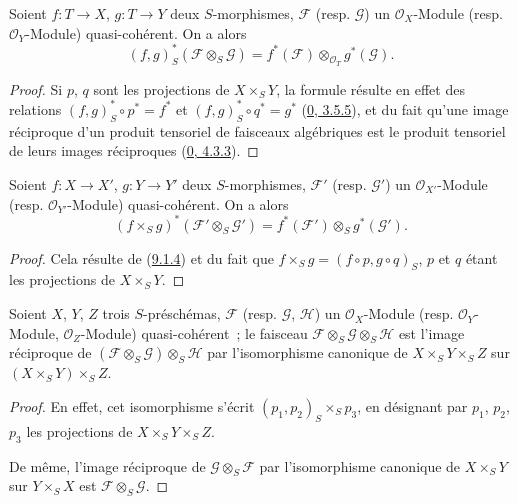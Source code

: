 \begin{proposition}[9.1.4]
\label{I.9.1.4-fr}
Soient $f:T\to X$, $g:T\to Y$ deux $S$-morphismes, $\mathscr{F}$ (resp.
$\mathscr{G}$) un $\mathscr{O}_X$-Module (resp. $\mathscr{O}_Y$-Module)
quasi-cohérent. On a alors
\[
  (f,g)_S^*(\mathscr{F}\otimes_S\mathscr{G})
  =f^*(\mathscr{F})\otimes_{\mathscr{O}_T}g^*(\mathscr{G}).
\]
\end{proposition}

\begin{proof}
Si $p$, $q$ sont les projections de $X\times_S Y$, la formule résulte en
effet des relations $(f,g)_S^*\circ p^*=f^*$ et
$(f,g)_S^*\circ q^*=g^*$ (\hyperref[0.3.5.5-fr]{0, 3.5.5}), et du fait
qu'une image réciproque d'un produit tensoriel de faisceaux algébriques est
le produit tensoriel de leurs images réciproques
(\hyperref[0.4.3.3-fr]{0, 4.3.3}).
\end{proof}

\begin{corollary}[9.1.5]
\label{I.9.1.5-fr}
Soient $f:X\to X'$, $g:Y\to Y'$ deux $S$-morphismes, $\mathscr{F}'$ (resp.
$\mathscr{G}'$) un $\mathscr{O}_{X'}$-Module (resp.
$\mathscr{O}_{Y'}$-Module) quasi-cohérent. On a alors
\[
  (f\times_S g)^*(\mathscr{F}'\otimes_S\mathscr{G}')
  =f^*(\mathscr{F}')\otimes_S g^*(\mathscr{G}').
\]
\end{corollary}

\begin{proof}
Cela résulte de (\hyperref[I.9.1.4-fr]{9.1.4}) et du fait que
$f\times_S g=(f\circ p,g\circ q)_S$, $p$ et $q$ étant les projections de
$X\times_S Y$.
\end{proof}

\begin{corollary}[9.1.6]
\label{I.9.1.6-fr}
Soient $X$, $Y$, $Z$ trois $S$-préschémas, $\mathscr{F}$ (resp.
$\mathscr{G}$, $\mathscr{H}$) un $\mathscr{O}_X$-Module (resp.
$\mathscr{O}_Y$-Module, $\mathscr{O}_Z$-Module) quasi-cohérent~; le faisceau
$\mathscr{F}\otimes_S\mathscr{G}\otimes_S\mathscr{H}$ est l'image
réciproque de
$(\mathscr{F}\otimes_S\mathscr{G})\otimes_S\mathscr{H}$ par l'isomorphisme
canonique de $X\times_S Y\times_S Z$ sur
$(X\times_S Y)\times_S Z$.
\end{corollary}

\begin{proof}
En effet, cet isomorphisme s'écrit $(p_1,p_2)_S\times_S p_3$, en désignant
par $p_1$, $p_2$, $p_3$ les projections de $X\times_S Y\times_S Z$.

De même, l'image réciproque de $\mathscr{G}\otimes_S\mathscr{F}$ par
l'isomorphisme canonique de $X\times_S Y$ sur $Y\times_S X$ est
$\mathscr{F}\otimes_S\mathscr{G}$.
\end{proof}

